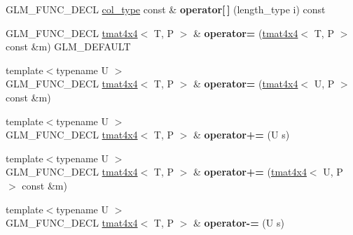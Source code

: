 \begin{DoxyCompactItemize}
\item 
\hypertarget{structglm_1_1tmat4x4_a2e54583cff9e350810ada5dbd693d1c7}{G\-L\-M\-\_\-\-F\-U\-N\-C\-\_\-\-D\-E\-C\-L \hyperlink{structglm_1_1tvec4}{col\-\_\-type} const \& {\bfseries operator\mbox{[}$\,$\mbox{]}} (length\-\_\-type i) const }\label{structglm_1_1tmat4x4_a2e54583cff9e350810ada5dbd693d1c7}

\item 
\hypertarget{structglm_1_1tmat4x4_a447cbc18d57fb508edaea874c107b4b2}{G\-L\-M\-\_\-\-F\-U\-N\-C\-\_\-\-D\-E\-C\-L \hyperlink{structglm_1_1tmat4x4}{tmat4x4}$<$ T, P $>$ \& {\bfseries operator=} (\hyperlink{structglm_1_1tmat4x4}{tmat4x4}$<$ T, P $>$ const \&m) G\-L\-M\-\_\-\-D\-E\-F\-A\-U\-L\-T}\label{structglm_1_1tmat4x4_a447cbc18d57fb508edaea874c107b4b2}

\item 
\hypertarget{structglm_1_1tmat4x4_af78f51e2bde3b85554c4f48bcca0cbf6}{{\footnotesize template$<$typename U $>$ }\\G\-L\-M\-\_\-\-F\-U\-N\-C\-\_\-\-D\-E\-C\-L \hyperlink{structglm_1_1tmat4x4}{tmat4x4}$<$ T, P $>$ \& {\bfseries operator=} (\hyperlink{structglm_1_1tmat4x4}{tmat4x4}$<$ U, P $>$ const \&m)}\label{structglm_1_1tmat4x4_af78f51e2bde3b85554c4f48bcca0cbf6}

\item 
\hypertarget{structglm_1_1tmat4x4_abc9e0d2f169a0a1040aafb8a8df0d4e7}{{\footnotesize template$<$typename U $>$ }\\G\-L\-M\-\_\-\-F\-U\-N\-C\-\_\-\-D\-E\-C\-L \hyperlink{structglm_1_1tmat4x4}{tmat4x4}$<$ T, P $>$ \& {\bfseries operator+=} (U s)}\label{structglm_1_1tmat4x4_abc9e0d2f169a0a1040aafb8a8df0d4e7}

\item 
\hypertarget{structglm_1_1tmat4x4_a64f3faf32fe23ebc92896ccf2199c372}{{\footnotesize template$<$typename U $>$ }\\G\-L\-M\-\_\-\-F\-U\-N\-C\-\_\-\-D\-E\-C\-L \hyperlink{structglm_1_1tmat4x4}{tmat4x4}$<$ T, P $>$ \& {\bfseries operator+=} (\hyperlink{structglm_1_1tmat4x4}{tmat4x4}$<$ U, P $>$ const \&m)}\label{structglm_1_1tmat4x4_a64f3faf32fe23ebc92896ccf2199c372}

\item 
\hypertarget{structglm_1_1tmat4x4_a2b6efc926899fe1c11355d187eec5d29}{{\footnotesize template$<$typename U $>$ }\\G\-L\-M\-\_\-\-F\-U\-N\-C\-\_\-\-D\-E\-C\-L \hyperlink{structglm_1_1tmat4x4}{tmat4x4}$<$ T, P $>$ \& {\bfseries operator-\/=} (U s)}\label{structglm_1_1tmat4x4_a2b6efc926899fe1c11355d187eec5d29}


\end{DoxyCompactItemize}
